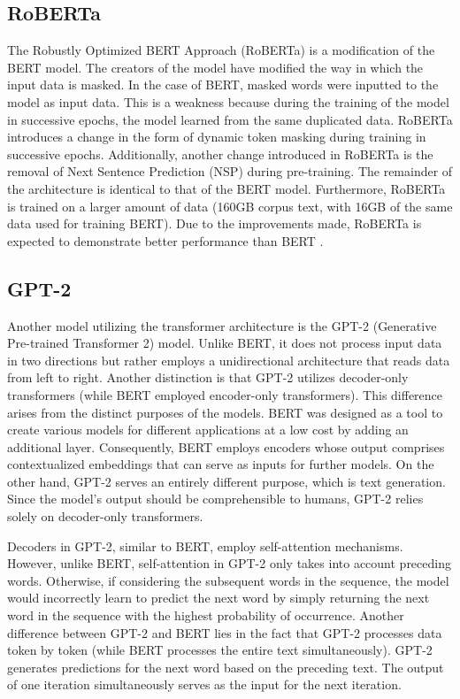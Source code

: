 \subsection{RoBERTa}
The Robustly Optimized BERT Approach (RoBERTa) is a modification of the BERT model. The creators of the model have modified the way in which the input data is masked. In the case of BERT, masked words were inputted to the model as input data. This is a weakness because during the training of the model in successive epochs, the model learned from the same duplicated data. RoBERTa introduces a change in the form of dynamic token masking during training in successive epochs. Additionally, another change introduced in RoBERTa is the removal of Next Sentence Prediction (NSP) during pre-training. The remainder of the architecture is identical to that of the BERT model.
Furthermore, RoBERTa is trained on a larger amount of data (160GB corpus text, with 16GB of the same data used for training BERT).
Due to the improvements made, RoBERTa is expected to demonstrate better performance than BERT \autocite{Liu2019}.

\subsection{GPT-2}
Another model utilizing the transformer architecture is the GPT-2 (Generative Pre-trained Transformer 2) model. Unlike BERT, it does not process input data in two directions but rather employs a unidirectional architecture that reads data from left to right. Another distinction is that GPT-2 utilizes decoder-only transformers (while BERT employed encoder-only transformers). This difference arises from the distinct purposes of the models. BERT was designed as a tool to create various models for different applications at a low cost by adding an additional layer. Consequently, BERT employs encoders whose output comprises contextualized embeddings that can serve as inputs for further models. On the other hand, GPT-2 serves an entirely different purpose, which is text generation. Since the model's output should be comprehensible to humans, GPT-2 relies solely on decoder-only transformers.

Decoders in GPT-2, similar to BERT, employ self-attention mechanisms. However, unlike BERT, self-attention in GPT-2 only takes into account preceding words. Otherwise, if considering the subsequent words in the sequence, the model would incorrectly learn to predict the next word by simply returning the next word in the sequence with the highest probability of occurrence. Another difference between GPT-2 and BERT lies in the fact that GPT-2 processes data token by token (while BERT processes the entire text simultaneously). GPT-2 generates predictions for the next word based on the preceding text. The output of one iteration simultaneously serves as the input for the next iteration.



